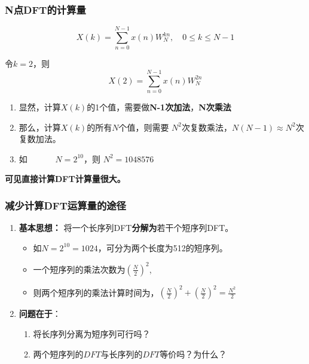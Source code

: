 \documentclass[notheorems,compress,mathserif,table]{beamer}
\begin{document}
\begin{frame}\frametitle{N点DFT的计算量}
$$    X(k)=\sum_{n=0}^{N-1}x(n)W_{N}^{kn},\quad 0\leq k\leq N-1  $$

令$k=2$，则
$$X(2)=\sum_{n=0}^{N-1}x(n)W_{N}^{2n}$$
\pause
\begin{enumerate}
  \item 显然，计算$X(k)$的1个值，需要做\textbf{N-1次加法}，\textbf{N次乘法}
  \item 那么，计算$X(k)$的所有$N$个值，则需要 $N^{2}$次复数乘法，$N(N-1)\approx N^2$次复数加法。
  \item 如$\quad\quad\quad$ $N=2^{10}$，则 $N^{2} = 1048576$
\end{enumerate}

\textbf{可见直接计算DFT计算量很大。}
\end{frame}

\begin{frame}\frametitle{减少计算DFT运算量的途径}
\begin{enumerate}
  \item \textbf{基本思想：} 将一个长序列DFT\textbf{分解为}若干个短序列DFT。\newline
  \begin{itemize}
    \item 如$N=2^{10}=1024$，可分为两个长度为512的短序列。 \newline
    \item 一个短序列的乘法次数为$(\frac{N}{2})^{2}$, \newline
    \item 则两个短序列的乘法计算时间为，$(\frac{N}{2})^{2}+(\frac{N}{2})^{2}= \frac{N^{2}}{2}$ \newline
  \end{itemize}
  \item  \textbf{问题在于}：\newline
  \begin{enumerate}
    \item 将长序列分离为短序列可行吗？\newline
    \item 两个短序列的$DFT$与长序列的$DFT$等价吗？为什么？\newline
  \end{enumerate}

\end{enumerate}
\end{frame}
\end{document}
